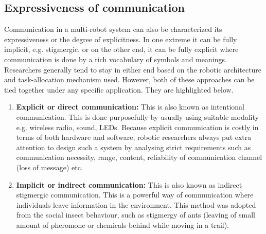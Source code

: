 \documentclass{intech}
\begin{document}
\subsection*{Expressiveness of communication}
Communication in a multi-robot system can also be characterized its expressiveness or the degree of explicitness. In one extreme it can be fully implicit, e.g. stigmergic, or on the other end, it can be fully explicit where communication is done by a rich vocabulary of symbols and meanings. Researchers generally tend to stay in either end based on the robotic architecture and task-allocation mechanism used. However, both of these approaches can be tied together under any specific application. They are highlighted below.
\begin{enumerate}
\item \textbf{Explicit or direct communication: }
This is also known as intentional communication. This is done purposefully by usually using suitable modality e.g. wireless radio, sound, LEDs. Because explicit communication is costly in terms of both hardware and software, robotic researchers always put extra attention to design such a system by analysing strict requirements such as communication necessity, range, content, reliability of communication channel (loss of message) etc.
%
\item \textbf{Implicit or indirect communication:} 
This is also known as indirect stigmergic communication. This is a powerful way of communication where individuals leave information in the environment. This method was adopted from the social insect behaviour, such as stigmergy of ants (leaving of small amount of pheromone or chemicals behind while moving in a trail).
\end{enumerate}
\end{document}
